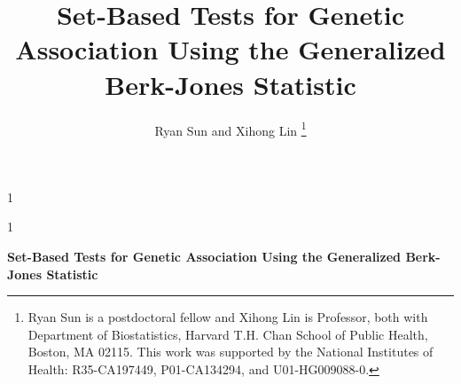 \documentclass[12pt]{article}
\renewcommand{\baselinestretch}{1}
\newcommand{\blind}{1}
\begin{document}

\def\spacingset#1{\renewcommand{\baselinestretch}%
{#1}\small\normalsize} \spacingset{1}



\blind
{
  \title{\bf Set-Based Tests for Genetic Association Using the Generalized Berk-Jones Statistic}
  \author{Ryan Sun and Xihong Lin
 \thanks{Ryan Sun is a postdoctoral fellow and Xihong Lin is Professor, both with Department of Biostatistics, Harvard T.H. Chan School of Public Health, Boston, MA 02115.  This work was supported by the National Institutes of Health: R35-CA197449, P01-CA134294, and U01-HG009088-0.}\hspace{.2cm}\\
 }
  \maketitle
} \fi

\blind
{
  \bigskip
  \bigskip
  \bigskip
  \begin{center}
    {\LARGE\bf Set-Based Tests for Genetic Association Using the Generalized Berk-Jones Statistic}
\end{center}
  \medskip
} \fi



\end{document}
